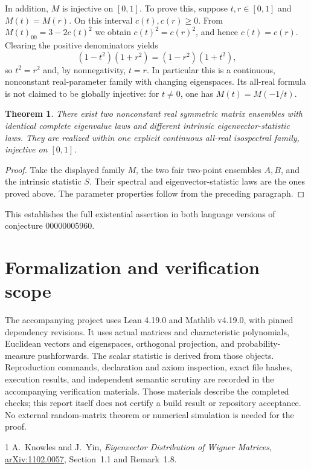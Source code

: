 \documentclass[10pt]{article}
\newtheorem{theorem}{Theorem}
\begin{document}
In addition, $M$ is injective on $[0,1]$. To prove this, suppose $t,r\in[0,1]$ and $M(t)=M(r)$. On this interval $c(t),c(r)\ge0$. From $M(t)_{00}=3-2c(t)^2$ we obtain $c(t)^2=c(r)^2$, and hence $c(t)=c(r)$. Clearing the positive denominators yields
\[
 (1-t^2)(1+r^2)=(1-r^2)(1+t^2),
\]
so $t^2=r^2$ and, by nonnegativity, $t=r$. In particular this is a continuous, nonconstant real-parameter family with changing eigenspaces. Its all-real formula is not claimed to be globally injective: for $t\ne0$, one has $M(t)=M(-1/t)$.

\begin{theorem}
There exist two nonconstant real symmetric matrix ensembles with identical complete eigenvalue laws and different intrinsic eigenvector-statistic laws. They are realized within one explicit continuous all-real isospectral family, injective on $[0,1]$.
\end{theorem}
\begin{proof}
Take the displayed family $M$, the two fair two-point ensembles $A,B$, and the intrinsic statistic $S$. Their spectral and eigenvector-statistic laws are the ones proved above. The parameter properties follow from the preceding paragraph.
\end{proof}
This establishes the full existential assertion in both language versions of conjecture 00000005960.

\section{Formalization and verification scope}
The accompanying project uses Lean 4.19.0 and Mathlib v4.19.0, with pinned dependency revisions. It uses actual matrices and characteristic polynomials, Euclidean vectors and eigenspaces, orthogonal projection, and probability-measure pushforwards. The scalar statistic is derived from those objects. Reproduction commands, declaration and axiom inspection, exact file hashes, execution results, and independent semantic scrutiny are recorded in the accompanying verification materials. Those materials describe the completed checks; this report itself does not certify a build result or repository acceptance. No external random-matrix theorem or numerical simulation is needed for the proof.

\begin{thebibliography}{1}
A.~Knowles and J.~Yin,
\emph{Eigenvector Distribution of Wigner Matrices},
\href{https://arxiv.org/abs/1102.0057}{arXiv:1102.0057},
Section~1.1 and Remark~1.8.
\end{thebibliography}
\end{document}
